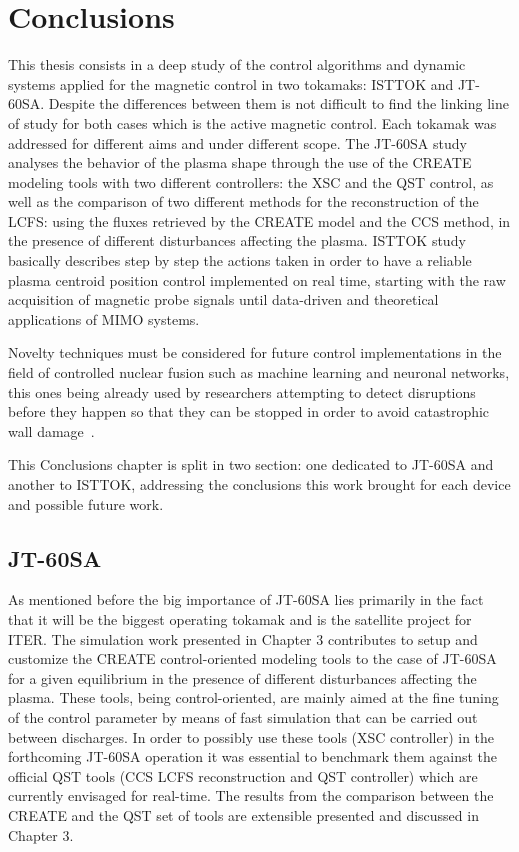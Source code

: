 \chapter{Conclusions}

This thesis consists in a deep study of the control algorithms and dynamic systems applied for the magnetic control in two tokamaks: ISTTOK and JT-60SA. Despite the  differences between them is not difficult to find the  linking line of study for both cases which is the active magnetic control. Each tokamak was addressed for different aims and under different scope. The JT-60SA study analyses the behavior of the plasma shape through the use of the CREATE modeling tools with two different controllers: the XSC and the QST control, as well as the comparison of two different methods for the reconstruction of the LCFS: using the fluxes retrieved by the CREATE model and the CCS method, in the presence of different disturbances affecting the plasma. ISTTOK study basically describes step by step the actions taken in order to have a reliable plasma centroid position control implemented on real time, starting with the raw acquisition of magnetic probe signals until  data-driven and theoretical applications of MIMO systems. \smallskip

Novelty techniques must be considered for future control implementations in the field of controlled nuclear fusion  such as machine learning and neuronal networks, this ones being already  used by researchers  attempting to detect disruptions before they happen so that they can be stopped in order to avoid catastrophic wall damage~\cite[Chapter~6]{Paluszek2020}.\smallskip

 This Conclusions chapter is split in two section: one dedicated to JT-60SA and another to ISTTOK, addressing the conclusions  this work brought for each device and possible future work.

\section{JT-60SA}

As mentioned before the big importance of JT-60SA  lies primarily in the fact that it will be the biggest operating tokamak and is the satellite project for ITER. The simulation work presented in Chapter 3 contributes to setup and customize the CREATE control-oriented modeling tools to the case of JT-60SA for a given equilibrium in the presence of different disturbances affecting the plasma. These tools, being control-oriented, are mainly aimed at the fine tuning of the control parameter by means of fast simulation that can be carried out between discharges. In order to possibly use these tools (XSC controller) in the forthcoming JT-60SA operation it was essential to benchmark them against the official QST tools (CCS LCFS reconstruction and QST controller) which are currently envisaged for real-time. The results from the comparison between the CREATE and the QST set of tools are extensible presented and discussed in Chapter 3.\smallskip

